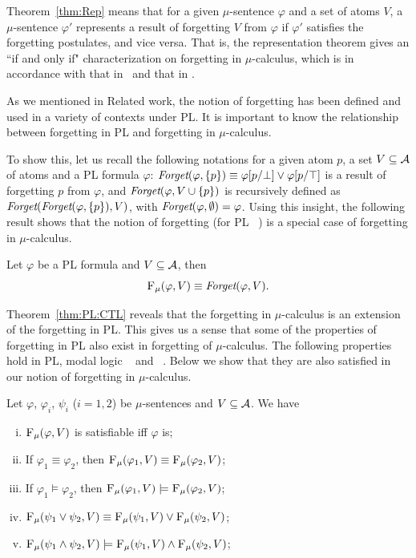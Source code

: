 \documentclass[runningheads]{llncs}
\begin{document}
Theorem~\ref{thm:Rep}  means that for a given $\mu$-sentence $\varphi$ and a set of atoms $V$, a $\mu$-sentence $\varphi'$ represents a result of forgetting $V$ from $\varphi$ if $\varphi'$ satisfies the forgetting postulates, and vice versa. That is, the representation theorem gives an ``if and only if" characterization on forgetting in $\mu$-calculus, which is in accordance with that in \SFive\ and that in \CTL.

As we mentioned in Related work, the notion of forgetting has been defined and used
in a variety of contexts under PL. It is important to know
the relationship between forgetting in PL and
forgetting in $\mu$-calculus.

To show this, let us recall the following notations for a given atom $p$, a set $V \subseteq {\cal A}$ of atoms and a PL formula $\varphi$:
$\textit{Forget}(\varphi, \{p\})\equiv \varphi[p/\bot] \vee \varphi[p/\top]$ is a result of forgetting $p$ from $\varphi$, and $\textit{Forget}(\varphi, V\cup \{p\})$ is recursively defined as $\textit{Forget}(\textit{Forget}(\varphi, \{p\}),V)$, with $\textit{Forget}(\varphi, \emptyset) = \varphi$.
Using this insight, the following result shows that the notion of forgetting (for PL ~\cite{lin1994forget}) is a special case of forgetting in $\mu$-calculus.

\begin{theorem}\label{thm:PL:CTL}
Let $\varphi$ be a PL formula and $V\subseteq {\cal A}$, then
\[
{\textsc{F}_{\textsc{$\mu$}}}(\varphi, V) \equiv \textit{Forget}(\varphi, V).
\]
\end{theorem}

Theorem~\ref{thm:PL:CTL} reveals that the forgetting in $\mu$-calculus is an extension of the forgetting in PL.
This gives us a sense that some of the properties of forgetting in PL also exist in forgetting of $\mu$-calculus.
The following properties hold in PL, modal logic \SFive~\cite{Yan:AIJ:2009} and \CTL~\cite{renyansfirstpaper}. Below we show that they are also satisfied in our notion of forgetting in $\mu$-calculus.

\begin{proposition}
\label{pro:ctl:forget:1}
 Let $\varphi$, $\varphi_i$, $\psi_i$ ($i=1,2$) be $\mu$-sentences and $V\subseteq {\cal A}$. We have
 \begin{enumerate}[(i)]
   \item ${\textsc{F}_{\textsc{$\mu$}}}(\varphi, V)$ is satisfiable iff $\varphi$ is;
   \item If $\varphi_1 \equiv \varphi_2$, then ${\textsc{F}_{\textsc{$\mu$}}}(\varphi_1, V) \equiv {\textsc{F}_{\textsc{$\mu$}}}(\varphi_2, V)$;
   \item If $\varphi_1 \models \varphi_2$, then ${\textsc{F}_{\textsc{$\mu$}}}(\varphi_1, V) \models {\textsc{F}_{\textsc{$\mu$}}}(\varphi_2, V)$;
   \item ${\textsc{F}_{\textsc{$\mu$}}}(\psi_1 \vee \psi_2, V) \equiv {\textsc{F}_{\textsc{$\mu$}}}(\psi_1, V) \vee {\textsc{F}_{\textsc{$\mu$}}}(\psi_2, V)$;
   \item ${\textsc{F}_{\textsc{$\mu$}}}(\psi_1 \wedge \psi_2, V) \models {\textsc{F}_{\textsc{$\mu$}}}(\psi_1, V) \wedge {\textsc{F}_{\textsc{$\mu$}}}(\psi_2, V)$;
 \end{enumerate}
\end{proposition}
\end{document}
